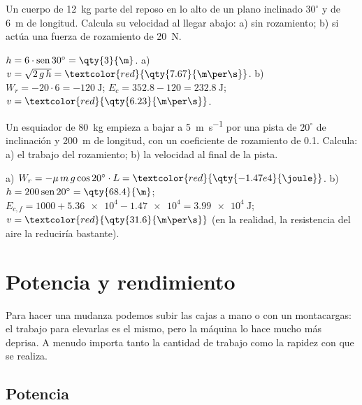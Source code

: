 \begin{exercise}
    Un cuerpo de \qty{12}{\kg} parte del reposo en lo alto de un plano inclinado \(30^\circ\) y de \qty{6}{\m} de longitud. Calcula su
    velocidad al llegar abajo: a) sin rozamiento; b) si actúa una fuerza de rozamiento de \qty{20}{\newton}.
    \begin{solu}
        \(h = 6 \cdot \sen 30^\circ = \qty{3}{\m}\). a) \(v = \sqrt{2\,g\,h} = \textcolor{red}{\qty{7.67}{\m\per\s}}\). b)
        \(W_r = -20 \cdot 6 = \qty{-120}{\joule}\); \(E_c = \num{352.8} - 120 = \qty{232.8}{\joule}\); \(v = \textcolor{red}{\qty{6.23}{\m\per\s}}\).
    \end{solu}
\end{exercise}

\begin{exercise}
    Un esquiador de \qty{80}{\kg} empieza a bajar a \qty{5}{\m\per\s} por una pista de \(20^\circ\) de inclinación y \qty{200}{\m} de
    longitud, con un coeficiente de rozamiento de \num{0.1}. Calcula: a) el trabajo del rozamiento; b) la velocidad al final de la pista.
    \begin{solu}
        a) \(W_r = -\mu\,m\,g\cos 20^\circ \cdot L = \textcolor{red}{\qty{-1.47e4}{\joule}}\). b) \(h = 200\sen 20^\circ = \qty{68.4}{\m}\);
        \(E_{c,f} = 1000 + \num{5.36e4} - \num{1.47e4} = \qty{3.99e4}{\joule}\); \(v = \textcolor{red}{\qty{31.6}{\m\per\s}}\) (en la
        realidad, la resistencia del aire la reduciría bastante).
    \end{solu}
\end{exercise}

\section{Potencia y rendimiento}\label{sec:ud12-potencia}

Para hacer una mudanza podemos subir las cajas a mano o con un montacargas: el trabajo para elevarlas es el mismo, pero la máquina lo
hace mucho más deprisa. A menudo importa tanto la cantidad de trabajo como la rapidez con que se realiza.

\subsection{Potencia}

